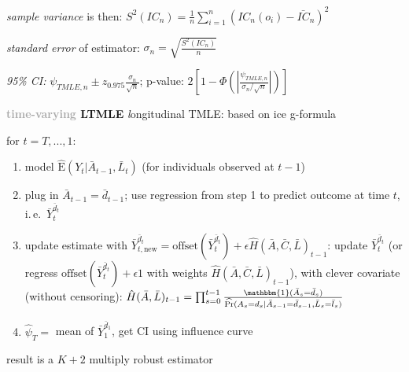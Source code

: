 \documentclass[8pt,twoside]{extarticle}
\begin{document}
\begin{multicols}{2}
 \textit{sample variance} is then: $S^2(IC_n) = \frac{1}{n}\sum_{i=1}^n\left(IC_n(o_i) - \bar{IC}_n\right)^2$

 \textit{standard error} of estimator: $\sigma_n = \sqrt{\frac{S^2(IC_n)}{n}}$

 \textit{95\% CI:} $\psi_{TMLE,n} \pm z_{0.975}\frac{\sigma_n}{\sqrt{n}}$; p-value: $2\left[1-\Phi\left(\left|\frac{\psi_{TMLE,n}}{\sigma_n/\sqrt{n}}\right|\right)\right]$

\vspace{0.2em}
 \colorbox{lightgray!20!white}{\begin{minipage}{28em}

\textbf{\textcolor{darkgray}{time-varying} LTMLE}
 \citep{schomaker_using_2019, van2012targeted} \textit{l}ongitudinal TMLE: based on ice g-formula

 for $t=T,..., 1$:
\begin{enumerate}[leftmargin=*, itemsep=0em, topsep=0pt, partopsep=0pt,parsep=0pt]
\item model $\widehat{\mathrm{E}}(Y_t|\bar{A}_{t-1}, \bar{L}_t)$ (for individuals observed at $t{-}1$)

\item plug in $\bar{A}_{t-1}=\bar{d}_{t-1}$; use regression from step 1 to predict outcome at time $t$, i.\,e.\ $\bar{Y}_t^{\bar{d}_t}$ 

\item update estimate
with $\bar{Y}_{t,\text{new}}^{\bar{d}_t} = \mathrm{offset}(\bar{Y}_t^{\bar{d}_t}) + \epsilon \hat{H}(\bar{A},\bar{C},\bar{L})_{t-1}$: update $\bar{Y}_t^{\bar{d}_t}$ (or regress $\mathrm{offset}(\bar{Y}_t^{\bar{d}_t}) + \epsilon 1$ with weights $\hat{H}(\bar{A},\bar{C},\bar{L})_{t-1}$), with
clever covariate (without censoring): $\hat{H}(\bar{A},\bar{L})_{t-1}=\prod_{s=0}^{t-1}\frac{\mathbbm{1}(\bar{A}_s = \bar{d}_s)}{\widehat{\mathrm{Pr}}(A_s=d_s| \bar{A}_{s-1} = \bar{d}_{s{-}1}, \bar{L}_s = \bar{l}_s )}$

\item $\hat{\psi}_T =$ mean of $\bar{Y}_1^{\bar{d}_1}$, get CI using influence curve
\end{enumerate}

result is a $K+2$ multiply robust estimator \citep{diaz2021nonparametric}

\end{minipage}}




\vspace{0.5em}


\end{multicols}
\end{document}
